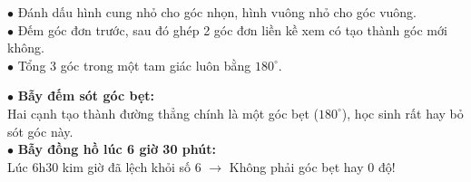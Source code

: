 \documentclass[14pt,a4paper,oneside]{extbook}
\begin{document}
\noindent
\begin{minipage}[t]{0.54\textwidth}
  \begin{tcolorbox}[
    enhanced,
    title={\footnotesize\bfseries\color{white}\faKey\ Quy tắc đánh dấu góc khi đếm hình},
    colback=green!3!white,
    colframe=green!60!black,
    arc=2.5mm, boxrule=0.8pt, top=1.8mm, bottom=1.8mm, left=2.2mm, right=2.2mm
  ]
    \footnotesize
    $\bullet$ Đánh dấu hình cung nhỏ cho góc nhọn, hình vuông nhỏ cho góc vuông.\\
    $\bullet$ Đếm góc đơn trước, sau đó ghép 2 góc đơn liền kề xem có tạo thành góc mới không.\\
    $\bullet$ Tổng 3 góc trong một tam giác luôn bằng $180^\circ$.
  \end{tcolorbox}
\end{minipage}%
\hfill
\begin{minipage}[t]{0.44\textwidth}
  \begin{tcolorbox}[
    enhanced,
    title={\footnotesize\bfseries\color{white}\faExclamationTriangle\ Mẹo tránh bẫy trắc nghiệm},
    colback=red!2!white,
    colframe=red!70!black,
    arc=2.5mm, boxrule=0.8pt, top=1.8mm, bottom=1.8mm, left=2.2mm, right=2.2mm
  ]
    \footnotesize
    $\bullet$ \textbf{Bẫy đếm sót góc bẹt:}\\
    Hai cạnh tạo thành đường thẳng chính là một góc bẹt ($180^\circ$), học sinh rất hay bỏ sót góc này.\\
    $\bullet$ \textbf{Bẫy đồng hồ lúc 6 giờ 30 phút:}\\
    Lúc 6h30 kim giờ đã lệch khỏi số 6 $\rightarrow$ Không phải góc bẹt hay 0 độ!
  \end{tcolorbox}
\end{minipage}
\end{document}
